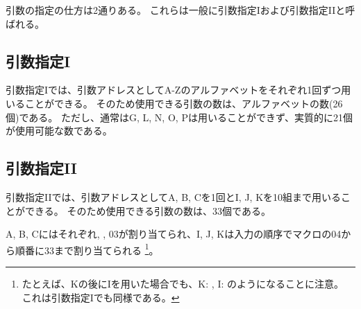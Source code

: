 




引数の指定の仕方は2通りある。
これらは一般に引数指定Iおよび引数指定IIと呼ばれる。


\subsection{引数指定I}
引数指定Iでは、引数アドレスとして{\ttfamily A}-{\ttfamily Z}のアルファベットをそれぞれ1回ずつ用いることができる。
そのため使用できる引数の数は、アルファベットの数(26個)である。
ただし、通常は{\ttfamily G}, {\ttfamily L}, {\ttfamily N}, {\ttfamily O}, {\ttfamily P}は用いることができず、実質的に21個が使用可能な数である。


\subsection{引数指定II}
引数指定IIでは、引数アドレスとして{\ttfamily A}, {\ttfamily B}, {\ttfamily C}を1回と{\ttfamily I}, {\ttfamily J}, {\ttfamily K}を10組まで用いることができる。
そのため使用できる引数の数は、33個である。

{\ttfamily A}, {\ttfamily B}, {\ttfamily C}にはそれぞれ\hk{}, , \ttNum03が割り当てられ、{\ttfamily I}, {\ttfamily J}, {\ttfamily K}は入力の順序でマクロの\hk\ttNum04から順番に\hk\ttNum33まで割り当てられる
\footnote{たとえば、{\ttfamily K}の後に{\ttfamily I}を用いた場合でも、{\ttfamily K}: {\ttfamily{}}, {\ttfamily I}: {\ttfamily{}}のようになることに注意。
これは引数指定Iでも同様である。}。



